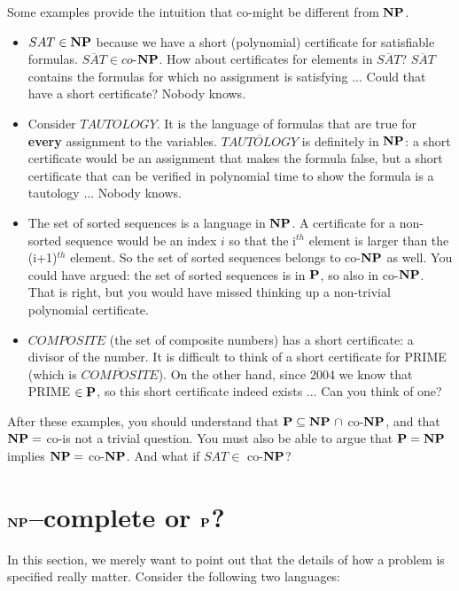 \begin{example}
Some examples provide the intuition that co-\NP might be different from $\NP$.
\begin{itemize}
\item $SAT \in \NP$ because we have a short (polynomial) certificate for
satisfiable formulas. $\overline{SAT} \in co$-$\NP$. How about
certificates for elements in $\overline{SAT}$? $\overline{SAT}$
contains the formulas for which no assignment is satisfying ... Could
that have a short certificate? Nobody knows.

\item Consider $TAUTOLOGY$. It is the language of formulas that are true
for {\bf every} assignment to the variables. $\overline{TAUTOLOGY}$
is definitely in $\NP$: a short certificate would be an assignment
that makes the formula false, but a short certificate that can be
verified in polynomial time to show the formula is a tautology
... Nobody knows.

\item The set of sorted sequences is a language in $\NP$. A certificate
for a non-sorted sequence would be an index $i$ so that the i$^{th}$
element is larger than the (i+1)$^{th}$ element. So the set of sorted
sequences belongs to co-$\NP$ as well. You could have argued: the set
of sorted sequences is in $\P$, so also in co-$\NP$. That is right, but
you would have missed thinking up a non-trivial polynomial certificate.

\item $COMPOSITE$ (the set of composite numbers) has a short certificate: a
divisor of the number. It is difficult to think of a short
certificate for PRIME (which is $\overline{COMPOSITE}$). On the other
hand, since 2004 we know that PRIME $\in \P$, so this short
certificate indeed exists ... Can you think of one?
\end{itemize}
\end{example}
After these examples, you should understand that $\P \subseteq \NP
~\cap$ co-$\NP$, and that $\NP = $ co-\NP is not a trivial question. You
must also be able to argue that $\P = \NP$ implies $\NP = $ co-$\NP$.
And what if $SAT \in$ co-$\NP$?

\section{$\NP$--complete or $\P$?}

In this section, we merely want to point out that the details of how a
problem is specified really matter. Consider the following two
languages:

